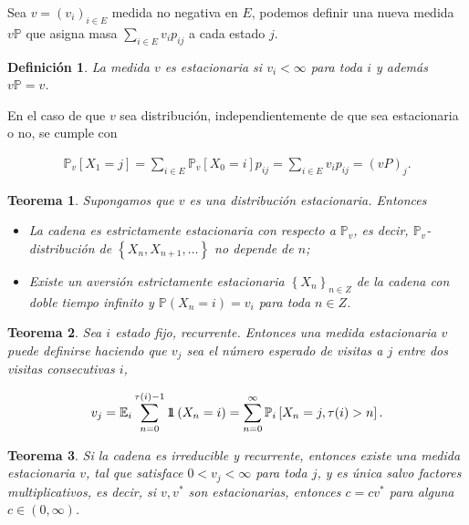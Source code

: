 \documentclass{article}
\newtheorem{Def}{Definición}[section]
\newtheorem{Teo}{Teorema}[section]
\newcommand{\esp}{\mathbb{E}}
\newcommand{\prob}{\mathbb{P}}
\newcommand{\indora}{\mbox{$1$\hspace{-0.8ex}$1$}}
\numberwithin{equation}{section}
\begin{document}
Sea $v=\left(v_{i}\right)_{i\in E}$ medida no negativa en $E$, podemos definir una nueva medida $v\prob$ que asigna masa $\sum_{i\in E}v_{i}p_{ij}$ a cada estado $j$.

\begin{Def}
La medida $v$ es estacionaria si $v_{i}<\infty$ para toda $i$ y adem\'as $v\prob=v$.
\end{Def}
En el caso de que $v$ sea distribuci\'on, independientemente de que sea estacionaria o no, se cumple con

\begin{eqnarray}
\prob_{v}\left[X_{1}=j\right]=\sum_{i\in E}\prob_{v}\left[X_{0}=i\right]p_{ij}=\sum_{i\in E}v_{i}p_{ij}=\left(vP\right)_{j}.
\end{eqnarray}

\begin{Teo}
Supongamos que $v$ es una distribuci\'on estacionaria. Entonces
\begin{itemize}
\item[i)] La cadena es estrictamente estacionaria con respecto a
$\prob_{v}$, es decir, $\prob_{v}$-distribuci\'on de $\left\{X_{n},X_{n+1},\ldots\right\}$ no depende de $n$;
\item[ii)] Existe un aversi\'on estrictamente estacionaria $\left\{X_{n}\right\}_{n\in Z}$ de la cadena con doble tiempo infinito y $\prob\left(X_{n}=i\right)=v_{i}$ para toda $n\in Z$.
\end{itemize}
\end{Teo}

\begin{Teo}
Sea $i$ estado fijo, recurrente. Entonces una medida estacionaria $v$ puede definirse haciendo que $v_{j}$ sea el n\'umero esperado de visitas a $j$ entre dos visitas consecutivas $i$,

\begin{equation}\label{Eq.3.1}
v_{j}=\esp_{i}\sum_{n=0}^{\tau(i)-1}\indora\left(X_{n}=i\right)=\sum_{n=0}^{\infty}\prob_{i}\left[X_{n}=j,\tau(i)>n\right].
\end{equation}
\end{Teo}

\begin{Teo}\label{Teo.3.3}
Si la cadena es irreducible y recurrente, entonces existe una medida estacionaria $v$, tal que satisface $0<v_{j}<\infty$ para toda $j$, y es \'unica salvo factores multiplicativos, es decir, si $v,v^{*}$ son estacionarias, entonces $c=cv^{*}$ para alguna $c\in\left(0,\infty\right)$.
\end{Teo}
\end{document}

